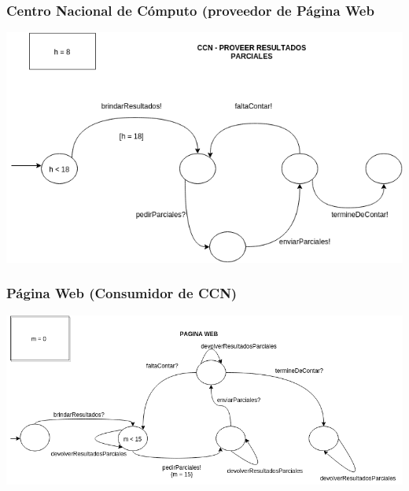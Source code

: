 \documentclass[spanish, 10pt,a4paper]{article}
\numberwithin{equation}{section} %
\begin{document}
\subsubsection{Centro Nacional de Cómputo (proveedor de Página Web}
\vspace{\baselineskip}
    \begin{center}
                \includegraphics[scale=0.50]{imagenes/fsm/FSMCCNProveedordeWeb2.png}
                \\
                \vspace{1pt}
                \footnotesize\textit{}
        \end{center}
\vspace{\baselineskip}

\subsubsection{Página Web (Consumidor de CCN)}
\vspace{\baselineskip}
    \begin{center}
                \includegraphics[scale=0.50]{imagenes/fsm/FSMWeb2.png}
                \\
                \vspace{1pt}
                \footnotesize\textit{}
        \end{center}
\vspace{\baselineskip}
\par 
\end{document}
